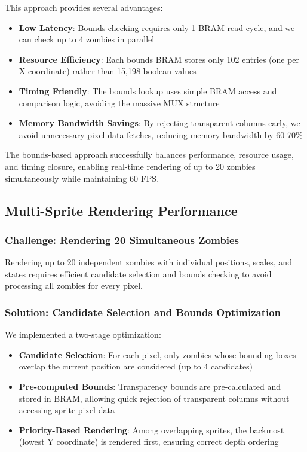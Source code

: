 \documentclass[12pt,a4paper]{article}
\begin{document}
This approach provides several advantages:
\begin{itemize}
    \item \textbf{Low Latency}: Bounds checking requires only 1 BRAM read cycle, and we can check up to 4 zombies in parallel
    \item \textbf{Resource Efficiency}: Each bounds BRAM stores only 102 entries (one per X coordinate) rather than 15,198 boolean values
    \item \textbf{Timing Friendly}: The bounds lookup uses simple BRAM access and comparison logic, avoiding the massive MUX structure
    \item \textbf{Memory Bandwidth Savings}: By rejecting transparent columns early, we avoid unnecessary pixel data fetches, reducing memory bandwidth by 60-70\%
\end{itemize}

The bounds-based approach successfully balances performance, resource usage, and timing closure, enabling real-time rendering of up to 20 zombies simultaneously while maintaining 60 FPS.

\subsection{Multi-Sprite Rendering Performance}

\subsubsection{Challenge: Rendering 20 Simultaneous Zombies}
Rendering up to 20 independent zombies with individual positions, scales, and states requires efficient candidate selection and bounds checking to avoid processing all zombies for every pixel.

\subsubsection{Solution: Candidate Selection and Bounds Optimization}
We implemented a two-stage optimization:
\begin{itemize}
    \item \textbf{Candidate Selection}: For each pixel, only zombies whose bounding boxes overlap the current position are considered (up to 4 candidates)
    \item \textbf{Pre-computed Bounds}: Transparency bounds are pre-calculated and stored in BRAM, allowing quick rejection of transparent columns without accessing sprite pixel data
    \item \textbf{Priority-Based Rendering}: Among overlapping sprites, the backmost (lowest Y coordinate) is rendered first, ensuring correct depth ordering
\end{itemize}
\end{document}

